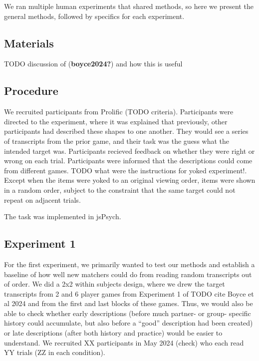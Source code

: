 \documentclass[10pt, letterpaper]{article}
\begin{document}
We ran multiple human experiments that shared methods, so here we
present the general methods, followed by specifics for each experiment.

\subsection{Materials}\label{materials}

TODO discussion of (\textbf{boyce2024?}) and how this is useful

\subsection{Procedure}\label{procedure}

We recruited participants from Prolific (TODO criteria). Participants
were directed to the experiment, where it was explained that previously,
other participants had described these shapes to one another. They would
see a series of transcripts from the prior game, and their task was the
guess what the intended target was. Participants recieved feedback on
whether they were right or wrong on each trial. Participants were
informed that the descriptions could come from different games. TODO
what were the instructions for yoked experiment!. Except when the items
were yoked to an original viewing order, items were shown in a random
order, subject to the constraint that the same target could not repeat
on adjacent trials.

The task was implemented in jsPsych.

\subsection{Experiment 1}\label{experiment-1}

For the first experiment, we primarily wanted to test our methods and
establish a baseline of how well new matchers could do from reading
random transcripts out of order. We did a 2x2 within subjects design,
where we drew the target transcripts from 2 and 6 player games from
Experiment 1 of TODO cite Boyce et al 2024 and from the first and last
blocks of these games. Thus, we would also be able to check whether
early descriptions (before much partner- or group- specific history
could accumulate, but also before a ``good'' description had been
created) or late descriptions (after both history and practice) would be
easier to understand. We recruited XX participants in May 2024 (check)
who each read YY trials (ZZ in each condition).
\end{document}

